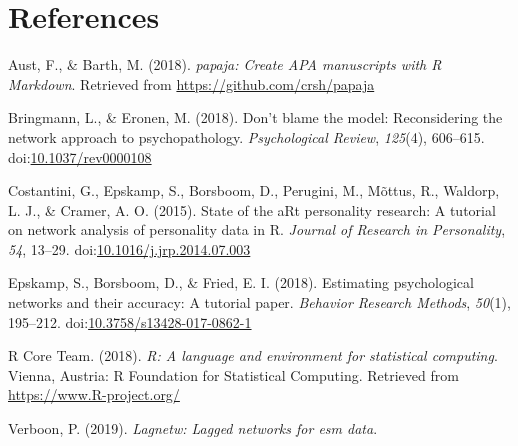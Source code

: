 \documentclass[man,floatsintext]{apa6}
\begin{document}
\section{References}\label{references}

\begingroup
\setlength{\parindent}{-0.5in} \setlength{\leftskip}{0.5in}

\hypertarget{refs}{}
\hypertarget{ref-R-papaja}{}
Aust, F., \& Barth, M. (2018). \emph{papaja: Create APA manuscripts with
R Markdown}. Retrieved from \url{https://github.com/crsh/papaja}

\hypertarget{ref-Bringmann2018a}{}
Bringmann, L., \& Eronen, M. (2018). Don't blame the model:
Reconsidering the network approach to psychopathology.
\emph{Psychological Review}, \emph{125}(4), 606--615.
doi:\href{https://doi.org/10.1037/rev0000108}{10.1037/rev0000108}

\hypertarget{ref-Costantini2015}{}
Costantini, G., Epskamp, S., Borsboom, D., Perugini, M., Mõttus, R.,
Waldorp, L. J., \& Cramer, A. O. (2015). State of the aRt personality
research: A tutorial on network analysis of personality data in R.
\emph{Journal of Research in Personality}, \emph{54}, 13--29.
doi:\href{https://doi.org/10.1016/j.jrp.2014.07.003}{10.1016/j.jrp.2014.07.003}

\hypertarget{ref-Epskamp2018}{}
Epskamp, S., Borsboom, D., \& Fried, E. I. (2018). Estimating
psychological networks and their accuracy: A tutorial paper.
\emph{Behavior Research Methods}, \emph{50}(1), 195--212.
doi:\href{https://doi.org/10.3758/s13428-017-0862-1}{10.3758/s13428-017-0862-1}

\hypertarget{ref-R-base}{}
R Core Team. (2018). \emph{R: A language and environment for statistical
computing}. Vienna, Austria: R Foundation for Statistical Computing.
Retrieved from \url{https://www.R-project.org/}

\hypertarget{ref-R-lagnetw}{}
Verboon, P. (2019). \emph{Lagnetw: Lagged networks for esm data}.

\endgroup
\end{document}

